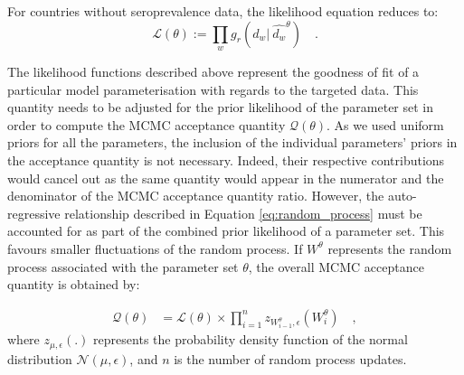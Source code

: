 For countries without seroprevalence data, the likelihood equation reduces to:
\begin{equation}
    \label{eq:likelihood_nosero}
    \mathcal{L}(\theta) := \prod_w g_r(d_w | \:\hat{d_w}^\theta) \quad.
\end{equation}

The likelihood functions described above represent the goodness of fit of a particular model parameterisation with regards to the targeted data. 
This quantity needs to be adjusted for the prior likelihood of the parameter set in order to compute the MCMC acceptance quantity $\mathcal{Q}(\theta)$.
As we used uniform priors for all the parameters, the inclusion of the individual parameters' priors in the acceptance quantity is not necessary. 
Indeed, their respective contributions would cancel out as the same quantity would appear in the numerator and the denominator of the 
MCMC acceptance quantity ratio. However, the auto-regressive relationship described in Equation \ref{eq:random_process}
must be accounted for as part of the combined prior likelihood of a parameter set. This favours smaller fluctuations of the random process.
If $W^\theta$ represents the random process associated with the parameter set $\theta$, the overall MCMC acceptance quantity is obtained by:

\begin{equation}
    \label{eq:acc_qtt}
    \begin{split}
    \mathcal{Q}(\theta) & = \mathcal{L}(\theta) \times \prod_{i=1}^{n} z_{W^\theta_{i-1},\epsilon}(W^\theta_i) \quad ,
    \end{split}
\end{equation}
where $z_{\mu,\epsilon}(.)$ represents the probability density function of the normal distribution $\mathcal{N}(\mu, \epsilon)$, and $n$ is the number 
of random process updates.


